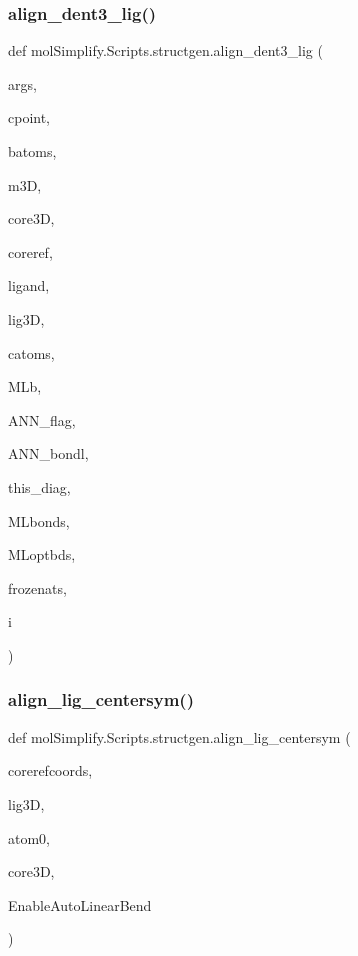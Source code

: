 \subsubsection{\texorpdfstring{align\+\_\+dent3\+\_\+lig()}{align\_dent3\_lig()}}
{\footnotesize\ttfamily def mol\+Simplify.\+Scripts.\+structgen.\+align\+\_\+dent3\+\_\+lig (\begin{DoxyParamCaption}\item[{}]{args,  }\item[{}]{cpoint,  }\item[{}]{batoms,  }\item[{}]{m3D,  }\item[{}]{core3D,  }\item[{}]{coreref,  }\item[{}]{ligand,  }\item[{}]{lig3D,  }\item[{}]{catoms,  }\item[{}]{M\+Lb,  }\item[{}]{A\+N\+N\+\_\+flag,  }\item[{}]{A\+N\+N\+\_\+bondl,  }\item[{}]{this\+\_\+diag,  }\item[{}]{M\+Lbonds,  }\item[{}]{M\+Loptbds,  }\item[{}]{frozenats,  }\item[{}]{i }\end{DoxyParamCaption})}

\mbox{\label{namespacemolSimplify_1_1Scripts_1_1structgen_a4de00a1cf6de4864f75bdf73db1f499a}} 
\subsubsection{\texorpdfstring{align\+\_\+lig\+\_\+centersym()}{align\_lig\_centersym()}}
{\footnotesize\ttfamily def mol\+Simplify.\+Scripts.\+structgen.\+align\+\_\+lig\+\_\+centersym (\begin{DoxyParamCaption}\item[{}]{corerefcoords,  }\item[{}]{lig3D,  }\item[{}]{atom0,  }\item[{}]{core3D,  }\item[{}]{Enable\+Auto\+Linear\+Bend }\end{DoxyParamCaption})}



